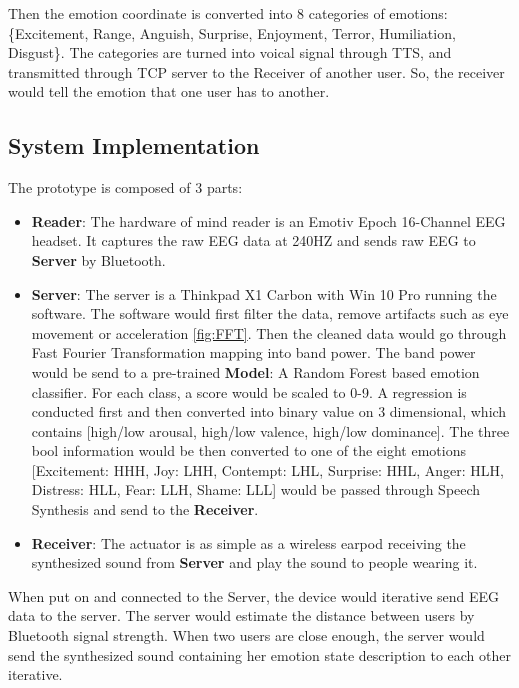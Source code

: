 \documentclass[a4paper]{article}
\begin{document}
Then the emotion coordinate is converted into 8 categories of emotions: \{Excitement, Range, Anguish, Surprise, Enjoyment, Terror, Humiliation, Disgust\}. The categories are turned into voical signal through TTS, and transmitted through TCP server to the Receiver of another user. So, the receiver would tell the emotion that one user has to another.

\subsection{System Implementation}

The prototype is composed of 3 parts:

\begin{itemize}
    \item \textbf {Reader}: The hardware of mind reader is an Emotiv Epoch 16-Channel EEG headset. It captures the raw EEG data at 240HZ and sends raw EEG to \textbf{Server} by Bluetooth.
    \item \textbf {Server}: The server is a Thinkpad X1 Carbon with Win 10 Pro running the software. The software would first filter the data, remove artifacts such as eye movement or acceleration \autocite{le2011method} \ref{fig:FFT}. Then the cleaned data would go through Fast Fourier Transformation mapping into band power. The band power would be send to a pre-trained \textbf{Model}: A Random Forest based emotion classifier. For each class, a score would be scaled to 0-9. A regression is conducted first and then converted into binary value on 3 dimensional, which contains [high/low arousal, high/low valence, high/low dominance]. The three bool information would be then converted to one of the eight emotions [Excitement: HHH, Joy: LHH, Contempt: LHL, Surprise: HHL, Anger: HLH, Distress: HLL, Fear: LLH, Shame: LLL] would be passed through Speech Synthesis and send to the \textbf{Receiver}.
    \item \textbf{Receiver}: The actuator is as simple as a wireless earpod receiving the synthesized sound from \textbf {Server} and play the sound to people wearing it.
\end{itemize}

When put on and connected to the Server, the device would iterative send EEG data to the server. The server would estimate the distance between users by Bluetooth signal strength. When two users are close enough, the server would send the synthesized sound containing her emotion state description to each other iterative.
\end{document}
